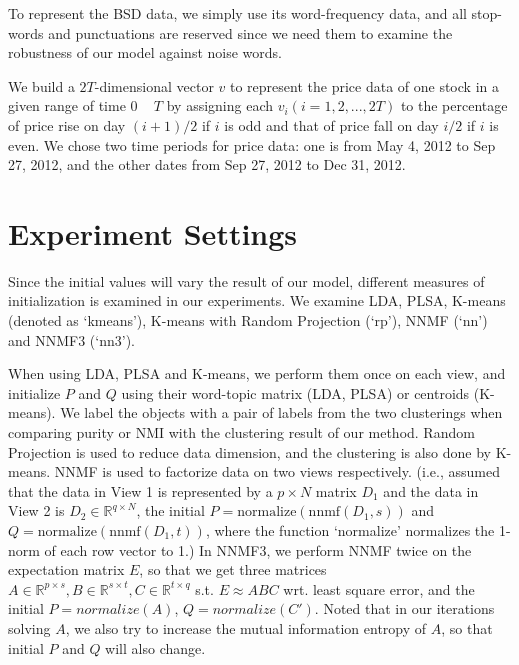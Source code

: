 \documentclass[12pt]{article}
\begin{document}
To represent the BSD data, we simply use its word-frequency data, and all stop-words and punctuations are reserved since we need them to examine the robustness of our model against noise words. 


We build a $2T$-dimensional vector $v$ to represent the price data of one stock in a given range of time $0$ ~ $T$ by assigning each $v_i (i=1,2,...,2T)$ to the percentage of price rise on day $(i+1)/2$ if $i$ is odd and that of price fall on day $i/2$ if $i$ is even. We chose two time periods for price data: one is from May 4, 2012 to Sep 27, 2012, and the other dates from Sep 27, 2012 to Dec 31, 2012.

\section{Experiment Settings}
Since the initial values will vary the result of our model, different measures of initialization is examined in our experiments. We examine LDA, PLSA, K-means (denoted as `kmeans'), K-means with Random Projection (`rp'), NNMF (`nn') and NNMF3 (`nn3').

When using LDA, PLSA and K-means, we perform them once on each view, and initialize $P$ and $Q$ using their word-topic matrix (LDA, PLSA) or centroids (K-means). We label the objects with a pair of labels from the two clusterings when comparing purity or NMI with the clustering result of our method. Random Projection is used to reduce data dimension, and the clustering is also done by K-means. NNMF is used to factorize data on two views respectively. (i.e., assumed that the data in View 1 is represented by a $p \times N$ matrix $D_1$ and the data in View 2 is $D_2 \in \mathbb{R}^{q \times N}$, the initial $P = \text{normalize}(\text{nnmf}(D_1, s))$ and $Q = \text{normalize}(\text{nnmf}(D_1, t))$, where the function `normalize' normalizes the 1-norm of each row vector to 1.) In NNMF3, we perform NNMF twice on the expectation matrix $E$, so that we get three matrices $A \in \mathbb{R}^{p \times s}, B \in \mathbb{R}^{s \times t}, C \in \mathbb{R}^{t \times q}$ s.t. $E \approx ABC$ wrt. least square error, and the initial $P = normalize(A)$, $Q = normalize(C')$. Noted that in our iterations solving $A$, we also try to increase the mutual information entropy of $A$, so that initial $P$ and $Q$ will also change.
\end{document}

